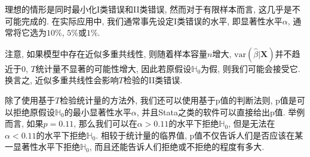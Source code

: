 \documentclass[cn, 12pt, math=mtpro2, bibstyle=apa, blue, twocol]{elegantbook}
\newcommand{\var}{\text{var}}
\newcommand{\X}{\mathbold{X}}
\newcommand{\hb}{\hat{\beta}}
\newcommand{\HH}{\mathbb{H}}
\begin{document}
理想的情形是同时最小化I类错误和II类错误, 然而对于有限样本而言, 这几乎是不可能完成的. 在实际应用中, 我们通常事先设定I类错误的水平, 即显著性水平$\alpha$, 通常将它选为$10\%$, $5\%$或$1\%$.

注意, 如果模型中存在近似多重共线性, 则随着样本容量$n$增大, $\var(\hb|\X)$并不趋近于0, $T$统计量不显著的可能性增大, 因此若原假设$\HH_0$为假, 则我们可能会接受它. 换言之, 近似多重共线性会影响$T$检验的II类错误.

除了使用基于$T$检验统计量的方法外, 我们还可以使用基于p值的判断法则, p值是可以拒绝原假设$\HH_0$的最小显著性水平$\alpha$, 并且Stata之类的软件可以直接给出p值. 举例而言, 如果$p=0.11$, 那么我们可以在$\alpha>0.11$的水平下拒绝$\HH_0$, 但是无法在$\alpha<0.11$的水平下拒绝$\HH_0$. 相较于统计量的临界值, p值不仅告诉人们是否应该在某一显著性水平下拒绝$\HH_0$, 而且还能告诉人们拒绝或不拒绝的程度有多大.
\end{document}
